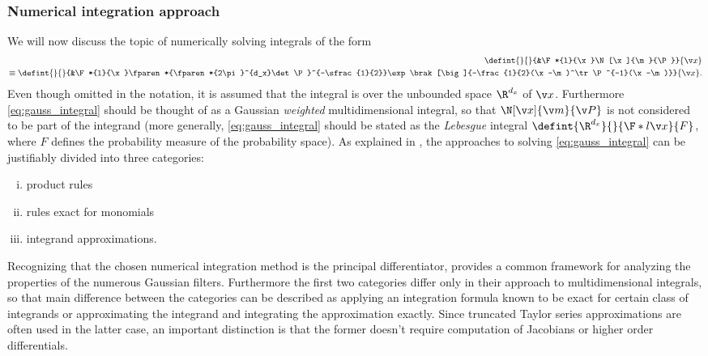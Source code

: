 \subsubsection{Numerical integration approach}
 We will now discuss the topic of numerically solving integrals of the form
 \begin{align}
	\defint{}{}{&\F*{l}{\x}\N[\x]{\m}{\P}}{\x} \nonumber\\
	\equiv\defint{}{}{&\F*{l}{\x}\fparen*{\fparen*{2\pi}^{d_x}\det\P}^{-\sfrac{1}{2}}\exp\brak[\big]{-\frac{1}{2}(\x-\m)^\tr\P^{-1}(\x-\m)}}{\x}.
	\label{eq:gauss_integral}
\end{align}%
%
Even though omitted in the notation, it is assumed that the integral
is over the unbounded space $\R^{d_x}$ of $\x$. Furthermore \eqref{eq:gauss_integral}
should be thought of as a Gaussian \emph{weighted} multidimensional integral, so that $\N[\x]{\m}{\P}$
is not considered to be part of the integrand (more generally, \eqref{eq:gauss_integral}
should be stated as the \emph{Lebesgue} integral $\defint{\R^{d_x}}{}{\F*{l}{\x}}{F}$, where $F$
defines the probability measure of the probability space).
As explained in \textcite{Wu2006}, the approaches to solving \eqref{eq:gauss_integral}
can be justifiably divided into three categories: 
\begin{enumerate}[i)] \addtolength{\leftskip}{.5cm} \itemsep1pt \parskip0pt 
  \item product rules
  \item rules exact for monomials
  \item integrand approximations.
\end{enumerate}
Recognizing that the chosen numerical integration method is the principal differentiator, provides a 
common framework for analyzing the properties of the numerous Gaussian filters.
Furthermore the first two categories differ only in their approach to multidimensional integrals,
so that main difference between the categories can be described
as applying an integration formula known to be exact for certain class of integrands
or approximating the integrand and integrating the approximation exactly.
Since truncated Taylor series approximations are often used in the latter case, an important distinction
is that the former doesn't require computation of Jacobians or higher order differentials. 

